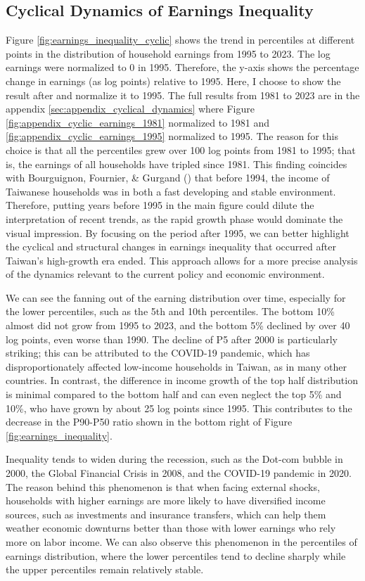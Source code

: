 \documentclass{article}
\begin{document}
\subsection{Cyclical Dynamics of Earnings Inequality}

Figure \ref{fig:earnings_inequality_cyclic} shows the trend in percentiles at different points in the distribution of household earnings from 1995 to 2023. The log earnings were normalized to 0 in 1995. Therefore, the y-axis shows the percentage change in earnings (as log points) relative to 1995.
Here, I choose to show the result after and normalize it to 1995. The full results from 1981 to 2023 are in the appendix \ref{sec:appendix_cyclical_dynamics} where Figure \ref{fig:appendix_cyclic_earnings_1981} normalized to 1981 and \ref{fig:appendix_cyclic_earnings_1995} normalized to 1995. 
The reason for this choice is that all the percentiles grew over 100 log points from 1981 to 1995; that is, the earnings of all households have tripled since 1981.
This finding coincides with Bourguignon, Fournier, \& Gurgand (\citeyear{TW_stable_dist}) that before 1994, the income of Taiwanese households was in both a fast developing and stable environment.
Therefore, putting years before 1995 in the main figure could dilute the interpretation of recent trends, as the rapid growth phase would dominate the visual impression. By focusing on the period after 1995, we can better highlight the cyclical and structural changes in earnings inequality that occurred after Taiwan's high-growth era ended. This approach allows for a more precise analysis of the dynamics relevant to the current policy and economic environment.

We can see the fanning out of the earning distribution over time, especially for the lower percentiles, such as the 5th and 10th percentiles. The bottom 10\% almost did not grow from 1995 to 2023, and the bottom 5\% declined by over 40 log points, even worse than 1990. The decline of P5 after 2000 is particularly striking; this can be attributed to the COVID-19 pandemic, which has disproportionately affected low-income households in Taiwan, as in many other countries.
In contrast, the difference in income growth of the top half distribution is minimal compared to the bottom half and can even neglect the top 5\% and 10\%, who have grown by about 25 log points since 1995. This contributes to the decrease in the P90-P50 ratio shown in the bottom right of Figure \ref{fig:earnings_inequality}.

Inequality tends to widen during the recession, such as the Dot-com bubble in 2000, the Global Financial Crisis in 2008, and the COVID-19 pandemic in 2020. The reason behind this phenomenon is that when facing external shocks, households with higher earnings are more likely to have diversified income sources, such as investments and insurance transfers, which can help them weather economic downturns better than those with lower earnings who rely more on labor income. We can also observe this phenomenon in the percentiles of earnings distribution, where the lower percentiles tend to decline sharply while the upper percentiles remain relatively stable.
\end{document}
